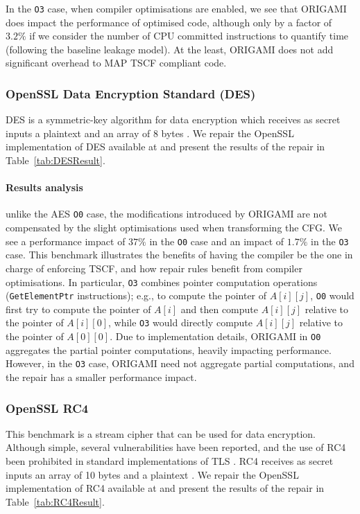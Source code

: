 {In the \texttt{O3} case, when compiler optimisations are enabled, we see that ORIGAMI does impact the performance of optimised code, although only by a factor of $3.2\%$ if we consider the number of CPU committed instructions to quantify time (following the baseline leakage model). At the least, ORIGAMI does not add significant overhead to MAP TSCF compliant code.

\subsubsection{OpenSSL Data Encryption Standard (DES)}
DES is a symmetric-key algorithm for data encryption which receives as secret inputs a plaintext %
 and an array of 8 bytes%
. %
We repair the OpenSSL implementation of DES available at \cite{OpenSSL} and present the results of the repair in Table~\ref{tab:DESResult}. %

\paragraph*{Results analysis} unlike the AES \texttt{O0} case, the modifications introduced by ORIGAMI are not compensated by the slight optimisations used when transforming the CFG. We see a performance impact of $37\%$ in the \texttt{O0} case and an impact of $1.7\%$ in the \texttt{O3} case. This benchmark illustrates the benefits of having the compiler be the one in charge of enforcing TSCF, and how repair rules benefit from compiler optimisations. In particular, \texttt{O3} combines pointer computation operations (\texttt{GetElementPtr} instructions); e.g., to compute the pointer of $A[i][j]$, \texttt{O0} would first try to compute the pointer of $A[i]$ and then compute $A[i][j]$ relative to the pointer of $A[i][0]$, while \texttt{O3} would directly compute $A[i][j]$ relative to the pointer of $A[0][0]$. Due to implementation details, ORIGAMI in \texttt{O0} aggregates the partial pointer computations, heavily impacting performance. However, in the \texttt{O3} case, ORIGAMI need not aggregate partial computations, and the repair has a smaller performance impact.
 
\subsubsection{OpenSSL RC4}
This benchmark is a stream cipher that can be used for data encryption. Although simple, several vulnerabilities have been reported, and the use of RC4 been prohibited in standard implementations of TLS \cite{rfc7465}. RC4 receives as secret inputs an array of 10 bytes %
and a plaintext%
 .%
  We repair the OpenSSL implementation of RC4 available at \cite{OpenSSL} and present the results of the repair in Table~\ref{tab:RC4Result}. 
 
}
